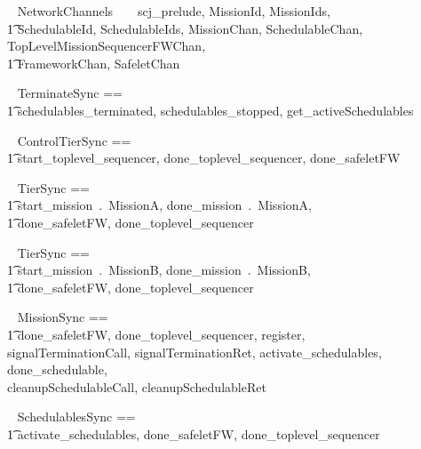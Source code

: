 

\begin{zsection}
	\SECTION ~ NetworkChannels ~ \parents ~ scj\_prelude, MissionId, MissionIds, \\
		\t1 SchedulableId, SchedulableIds, MissionChan, SchedulableChan, TopLevelMissionSequencerFWChan,\\
		\t1 FrameworkChan, SafeletChan
\end{zsection}
%
\begin{circus}
\circchannelset ~ TerminateSync == \\ \t1 \lchanset schedulables\_terminated, schedulables\_stopped, get\_activeSchedulables \rchanset
\end{circus}
%
\begin{circus}
\circchannelset ~ ControlTierSync ==\\ \t1 \lchanset start\_toplevel\_sequencer, done\_toplevel\_sequencer, done\_safeletFW \rchanset
\end{circus}
\begin{circus}
\circchannelset ~ TierSync == \\ \t1 \lchanset start\_mission~.~MissionA, done\_mission~.~MissionA,\\
	\t1 done\_safeletFW, done\_toplevel\_sequencer \rchanset
\end{circus}
\begin{circus}
\circchannelset ~ TierSync == \\ \t1 \lchanset start\_mission~.~MissionB, done\_mission~.~MissionB,\\
	\t1 done\_safeletFW, done\_toplevel\_sequencer \rchanset
\end{circus}
%
\begin{circus}
\circchannelset ~ MissionSync == \\ \t1 \lchanset done\_safeletFW, done\_toplevel\_sequencer, register, \\
                 signalTerminationCall, signalTerminationRet, activate\_schedulables, done\_schedulable, \\
                 cleanupSchedulableCall, cleanupSchedulableRet  \rchanset
\end{circus}
%
\begin{circus}
\circchannelset ~ SchedulablesSync == \\ \t1 \lchanset activate\_schedulables, done\_safeletFW, done\_toplevel\_sequencer \rchanset
\end{circus}
